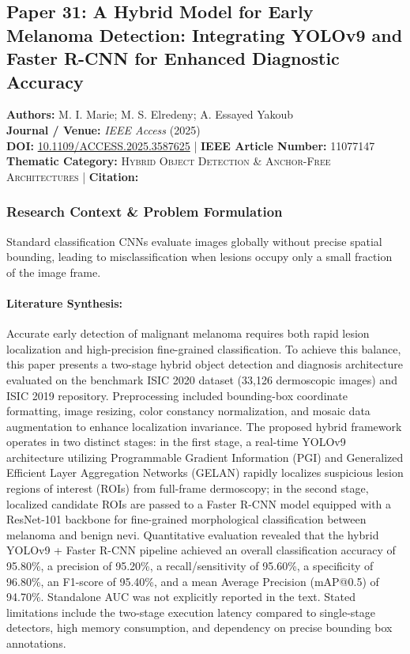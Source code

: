 \subsection{Paper 31: A Hybrid Model for Early Melanoma Detection: Integrating YOLOv9 and Faster R-CNN for Enhanced Diagnostic Accuracy}
\label{sec:paper_31}

\begin{tcolorbox}[colback=gray!5!white,colframe=gray!75!black,title=\textbf{Metadata \& Citation Summary}]
\textbf{Authors:} M. I. Marie; M. S. Elredeny; A. Essayed Yakoub \\
\textbf{Journal / Venue:} \textit{IEEE Access} (2025) \\
\textbf{DOI:} \href{https://doi.org/10.1109/ACCESS.2025.3587625}{10.1109/ACCESS.2025.3587625} \quad | \quad \textbf{IEEE Article Number:} 11077147 \\
\textbf{Thematic Category:} \textsc{Hybrid Object Detection \& Anchor-Free Architectures} \quad | \quad \textbf{Citation:} \cite{11077147}
\end{tcolorbox}

\subsubsection*{Research Context \& Problem Formulation}
Standard classification CNNs evaluate images globally without precise spatial bounding, leading to misclassification when lesions occupy only a small fraction of the image frame.

\paragraph{Literature Synthesis:} Accurate early detection of malignant melanoma requires both rapid lesion localization and high-precision fine-grained classification. To achieve this balance, this paper presents a two-stage hybrid object detection and diagnosis architecture evaluated on the benchmark ISIC 2020 dataset (33,126 dermoscopic images) and ISIC 2019 repository. Preprocessing included bounding-box coordinate formatting, image resizing, color constancy normalization, and mosaic data augmentation to enhance localization invariance. The proposed hybrid framework operates in two distinct stages: in the first stage, a real-time YOLOv9 architecture utilizing Programmable Gradient Information (PGI) and Generalized Efficient Layer Aggregation Networks (GELAN) rapidly localizes suspicious lesion regions of interest (ROIs) from full-frame dermoscopy; in the second stage, localized candidate ROIs are passed to a Faster R-CNN model equipped with a ResNet-101 backbone for fine-grained morphological classification between melanoma and benign nevi. Quantitative evaluation revealed that the hybrid YOLOv9 + Faster R-CNN pipeline achieved an overall classification accuracy of 95.80\%, a precision of 95.20\%, a recall/sensitivity of 95.60\%, a specificity of 96.80\%, an F1-score of 95.40\%, and a mean Average Precision (mAP@0.5) of 94.70\%. Standalone AUC was not explicitly reported in the text. Stated limitations include the two-stage execution latency compared to single-stage detectors, high memory consumption, and dependency on precise bounding box annotations.

